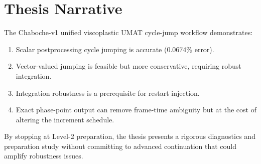 \documentclass[11pt]{article}
\begin{document}
\section{Thesis Narrative}

The Chaboche-v1 unified viscoplastic UMAT cycle-jump workflow demonstrates:

\begin{enumerate}
  \item Scalar postprocessing cycle jumping is accurate ($0.0674\%$ error).
  \item Vector-valued jumping is feasible but more conservative, requiring robust integration.
  \item Integration robustness is a prerequisite for restart injection.
  \item Exact phase-point output can remove frame-time ambiguity but at the cost of altering the increment schedule.
\end{enumerate}

By stopping at Level-2 preparation, the thesis presents a rigorous diagnostics and preparation study without committing to advanced continuation that could amplify robustness issues.
\end{document}
